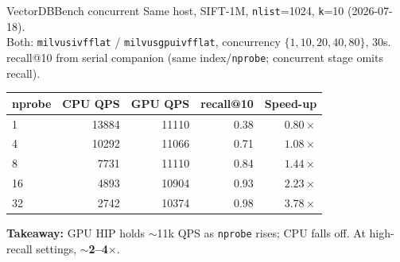 \documentclass[aspectratio=169,11pt]{beamer}
\begin{document}
\begin{frame}{VectorDBBench concurrent}
  \footnotesize
  Same host, SIFT-1M, \texttt{nlist}=1024, \texttt{k}=10 (2026-07-18).\\
  Both: \texttt{milvusivfflat} / \texttt{milvusgpuivfflat}, concurrency
  $\{1,10,20,40,80\}$, 30s.\\
  recall@10 from serial companion
  (same index/\texttt{nprobe}; concurrent stage omits recall).\\[0.25em]

  \begin{center}
  \begin{tabular}{@{}lrrrr@{}}
    \toprule
    \textbf{nprobe} & \textbf{CPU QPS} & \textbf{GPU QPS} & \textbf{recall@10} & \textbf{Speed-up} \\
    \midrule
    1  & 13884 & 11110 & 0.38 & $0.80\times$ \\
    4  & 10292 & 11066 & 0.71 & $1.08\times$ \\
    8  &  7731 & 11110 & 0.84 & $1.44\times$ \\
    16 &  4893 & 10904 & 0.93 & $2.23\times$ \\
    32 &  2742 & 10374 & 0.98 & $3.78\times$ \\
    \bottomrule
  \end{tabular}
  \end{center}

  \vspace{0.3em}
  \textbf{Takeaway:} GPU HIP holds $\sim$11k QPS as \texttt{nprobe} rises;
  CPU falls off. At high-recall settings, \textbf{$\sim$2--4$\times$}.
\end{frame}
\end{document}
